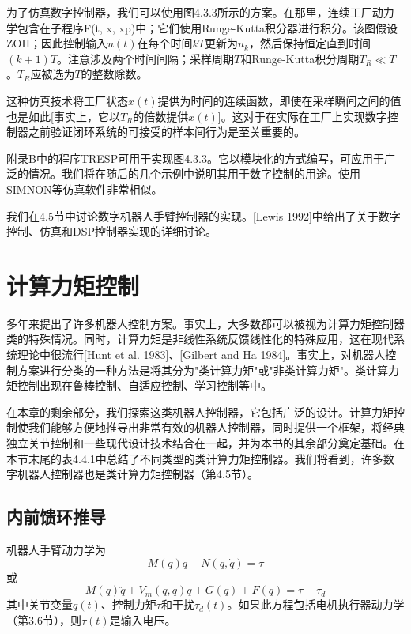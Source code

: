 \documentclass[UTF8]{ctexart}
\theoremstyle{definition}
\begin{document}
为了仿真数字控制器，我们可以使用图4.3.3所示的方案。在那里，连续工厂动力学包含在子程序F(t, x, xp)中；它们使用Runge-Kutta积分器进行积分。该图假设ZOH；因此控制输入$u(t)$在每个时间$kT$更新为$u_k$，然后保持恒定直到时间$(k+1)T$。注意涉及两个时间间隔；采样周期$T$和Runge-Kutta积分周期$T_R \ll T$。$T_R$应被选为$T$的整数除数。

这种仿真技术将工厂状态$x(t)$提供为时间的连续函数，即使在采样瞬间之间的值也是如此[事实上，它以$T_R$的倍数提供$x(t)$]。这对于在实际在工厂上实现数字控制器之前验证闭环系统的可接受的样本间行为是至关重要的。

附录B中的程序TRESP可用于实现图4.3.3。它以模块化的方式编写，可应用于广泛的情况。我们将在随后的几个示例中说明其用于数字控制的用途。使用SIMNON等仿真软件非常相似。

我们在4.5节中讨论数字机器人手臂控制器的实现。[Lewis 1992]中给出了关于数字控制、仿真和DSP控制器实现的详细讨论。

\section{计算力矩控制}

多年来提出了许多机器人控制方案。事实上，大多数都可以被视为计算力矩控制器类的特殊情况。同时，计算力矩是非线性系统反馈线性化的特殊应用，这在现代系统理论中很流行[Hunt et al. 1983]、[Gilbert and Ha 1984]。事实上，对机器人控制方案进行分类的一种方法是将其分为"类计算力矩"或"非类计算力矩"。类计算力矩控制出现在鲁棒控制、自适应控制、学习控制等中。

在本章的剩余部分，我们探索这类机器人控制器，它包括广泛的设计。计算力矩控制使我们能够方便地推导出非常有效的机器人控制器，同时提供一个框架，将经典独立关节控制和一些现代设计技术结合在一起，并为本书的其余部分奠定基础。在本节末尾的表4.4.1中总结了不同类型的类计算力矩控制器。我们将看到，许多数字机器人控制器也是类计算力矩控制器（第4.5节）。

\subsection{内前馈环推导}

机器人手臂动力学为
\begin{equation}
    M(q)\ddot{q} + N(q, \dot{q}) = \tau
\end{equation}
或
\begin{equation}
    M(q)\ddot{q} + V_m(q, \dot{q})\dot{q} + G(q) + F(\dot{q}) = \tau - \tau_d
\end{equation}
其中关节变量$q(t)$、控制力矩$\tau$和干扰$\tau_d(t)$。如果此方程包括电机执行器动力学（第3.6节），则$\tau(t)$是输入电压。
\end{document}
